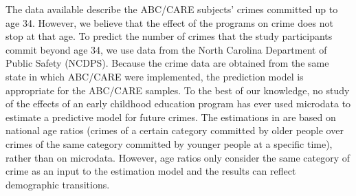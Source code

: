 \noindent The data available describe the ABC/CARE subjects' crimes committed up to age 34. However, we believe that the effect of the programs on crime does not stop at that age. To predict the number of crimes that the study participants commit beyond age 34, we use data from the North Carolina Department of Public Safety (NCDPS). Because the crime data are obtained from the same state in which ABC/CARE were implemented, the prediction model is appropriate for the ABC/CARE samples. To the best of our knowledge, no study of the effects of an early childhood education program has ever used microdata to estimate a predictive model for future crimes. The estimations in \cite{Heckman_Moon_etal_2010_RateofReturn} are based on national age ratios (crimes of a certain category committed by older people over crimes of the same category committed by younger people at a specific time), rather than on microdata. However, age ratios only consider the same category of crime as an input to the estimation model and the results can reflect demographic transitions. \\

